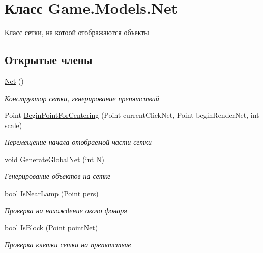 \hypertarget{class_game_1_1_models_1_1_net}{}\section{Класс Game.\+Models.\+Net}
\label{class_game_1_1_models_1_1_net}


Класс сетки, на котоой отображаются объекты  


\subsection*{Открытые члены}
\begin{DoxyCompactItemize}
\item 
\hyperlink{class_game_1_1_models_1_1_net_aa67c03c5f8ad53e819b0b5c2ee6178bd}{Net} ()
\begin{DoxyCompactList}\small\item\em Конструктор сетки, генерирование препятствий \end{DoxyCompactList}\item 
Point \hyperlink{class_game_1_1_models_1_1_net_a8c05bb4cd220b4b8919cc03a48656181}{Begin\+Point\+For\+Centering} (Point current\+Click\+Net, Point begin\+Render\+Net, int scale)
\begin{DoxyCompactList}\small\item\em Перемещение начала отобраемой части сетки \end{DoxyCompactList}\item 
void \hyperlink{class_game_1_1_models_1_1_net_a0ff5fb951d307dcd7b90796bff75fcd9}{Generate\+Global\+Net} (int \hyperlink{class_game_1_1_models_1_1_net_aa7d92ddfdbc6d8e1abe177c1ca81f668}{N})
\begin{DoxyCompactList}\small\item\em Генерирование объектов на сетке \end{DoxyCompactList}\item 
bool \hyperlink{class_game_1_1_models_1_1_net_aca9587ab3eac33b7f6b86cbe5148b870}{Is\+Near\+Lamp} (Point pers)
\begin{DoxyCompactList}\small\item\em Проверка на нахождение около фонаря \end{DoxyCompactList}\item 
bool \hyperlink{class_game_1_1_models_1_1_net_a50459352358d183e0c9dbb57f9a8327d}{Is\+Block} (Point point\+Net)
\begin{DoxyCompactList}\small\item\em Проверка клетки сетки на препятствие \end{DoxyCompactList}\item 

\end{DoxyCompactItemize}
